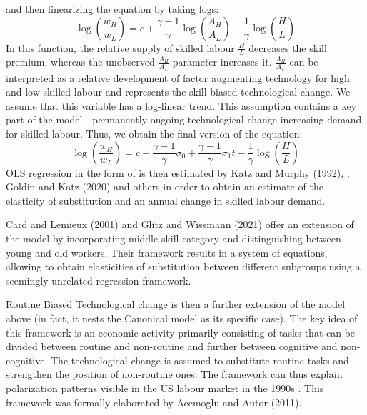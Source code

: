 \documentclass[11pt]{article}
\begin{document}
and then linearizing the equation by taking logs:
\[\log(\frac{w_{H}}{w_{L}}) = c + \frac{\gamma - 1}{\gamma}\log(\frac{A_{H}}{A_{L}}) - \frac{1}{\gamma}\log(\frac{H}{L})\]
In this function, the relative supply of skilled labour $\frac{H}{L}$ decreases the skill premium, whereas the unobserved $\frac{A_{H}}{A_{L}}$ parameter increases it. $\frac{A_{H}}{A_{L}}$ can be interpreted as a relative development of factor augmenting technology for high and low skilled labour and represents the skill-biased technological change. We assume that this variable has a log-linear trend. This assumption contains a key part of the model - permanently ongoing technological change increasing demand for skilled labour. Thus, we obtain the final version of the equation:
\begin{equation}
\label{eqn:STBC_regression}
\log(\frac{w_{H}}{w_{L}}) = c + \frac{\gamma - 1}{\gamma}\sigma_0 + \frac{\gamma - 1}{\gamma}\sigma_{1}t - \frac{1}{\gamma}\log(\frac{H}{L})
\end{equation}
OLS regression in the form of is then estimated by Katz and Murphy (1992), \citep{acemoglu2012does}, Goldin and Katz (2020) and others in order to obtain an estimate of the elasticity of substitution and an annual change in skilled labour demand.

Card and Lemieux (2001) and Glitz and Wissmann (2021) offer an extension of the model by incorporating middle skill category and distinguishing between young and old workers. Their framework results in a system of equations, allowing to obtain elasticities of substitution between different subgroups using a seemingly unrelated regression framework.

Routine Biased Technological change is then a further extension of the model above (in fact, it nests the Canonical model as its specific case). The key idea of this framework is an economic activity primarily consisting of tasks that can be divided between routine and non-routine and further between cognitive and non-cognitive. The technological change is assumed to substitute routine tasks and strengthen the position of non-routine ones. The framework can thus explain polarization patterns visible in the US labour market in the 1990s \citep{autor2014polanyi}. This framework was formally elaborated by Acemoglu and Autor (2011).
\end{document}
